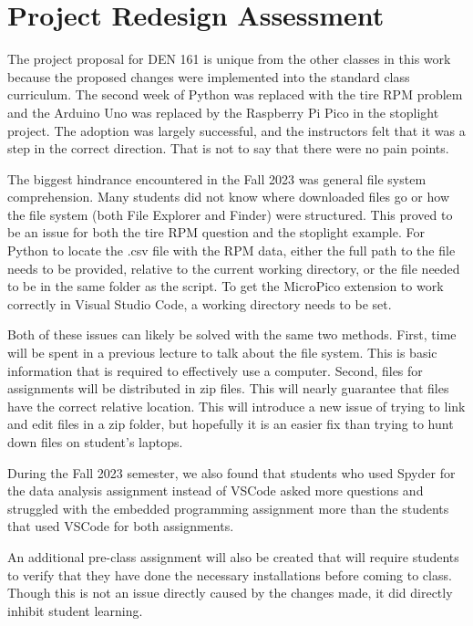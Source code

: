 \section{Project Redesign Assessment}

The project proposal for DEN 161 is unique from the other classes in this work because the proposed changes were
implemented into the standard class curriculum. The second week of Python was replaced with the tire RPM problem
and the Arduino Uno was replaced by the Raspberry Pi Pico in the stoplight project. The adoption was largely 
successful, and the instructors felt that it was a step in the correct direction. That is not to say that there
were no pain points.

The biggest hindrance encountered in the Fall 2023 was general file system comprehension. Many students did not 
know where downloaded files go or how the file system (both File Explorer and Finder) were structured. This proved 
to be an issue for both the tire RPM question and the stoplight example. For Python to locate the .csv file 
with the RPM data, either the full path to the file needs to be provided, relative to the current working directory,
or the file needed to be in the same folder as the script. To get the MicroPico extension to work correctly in
Visual Studio Code, a working directory needs to be set. 

Both of these issues can likely be solved with the same two methods. First, time will be spent in a previous lecture
to talk about the file system. This is basic information that is required to effectively use a computer. Second,
files for assignments will be distributed in zip files. This will nearly guarantee that files have the correct
relative location. This will introduce a new issue of trying to link and edit files in a zip folder, but hopefully
it is an easier fix than trying to hunt down files on student's laptops.

During the Fall 2023 semester, we also found that students who used Spyder for the data analysis assignment instead 
of VSCode asked more questions and struggled with the embedded programming assignment more than the students that 
used VSCode for both assignments.

An additional pre-class assignment will also be created that will require students to verify that they have
done the necessary installations before coming to class. Though this is not an issue directly caused by the changes
made, it did directly inhibit student learning.

